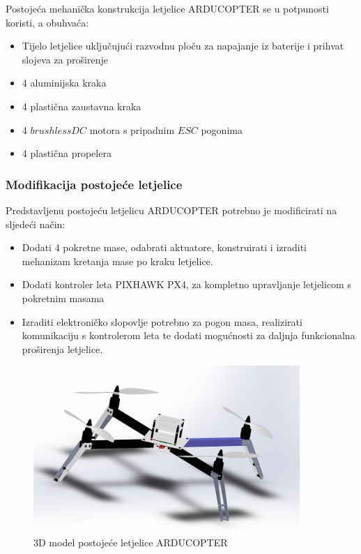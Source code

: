 \documentclass[11pt,a4paper]{article}
\begin{document}
Postojeća mehanička konstrukcija letjelice ARDUCOPTER se u potpunosti koristi, a obuhvaća: 
\begin{center}
	\begin{itemize}
		\item Tijelo letjelice uključujući razvodnu ploču za napajanje iz baterije i prihvat slojeva za proširenje
		\item 4 aluminijska kraka
		\item 4 plastična zaustavna kraka
		\item 4 $brushless DC$ motora s pripadnim $ESC$ pogonima
		\item 4 plastična propelera
	\end{itemize}
\end{center}

\subsubsection*{Modifikacija postojeće letjelice}
Predstavljenu postojeću letjelicu ARDUCOPTER potrebno je modificirati na sljedeći način:
\begin{center}
	\begin{itemize}
		\item Dodati 4 pokretne mase, odabrati aktuatore, konstruirati i izraditi mehanizam kretanja mase po kraku letjelice.
		\item Dodati kontroler leta PIXHAWK PX4, za kompletno upravljanje letjelicom s pokretnim masama
		\item Izraditi elektroničko slopovlje potrebno za pogon masa, realizirati komunikaciju s kontrolerom leta te dodati mogućnosti za daljnja funkcionalna proširenja letjelice.
	\end{itemize}
\end{center}


\begin{figure}[H]
	\centering
	\includegraphics[width=0.9\textwidth]{figures/arducopter_original.png}
	\caption{3D model postojeće letjelice ARDUCOPTER}
	\label{fig:3D_drone_original}
\end{figure}
\end{document}
